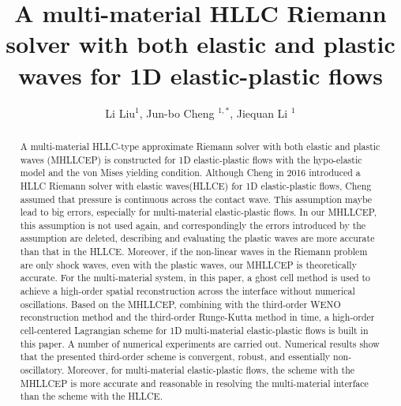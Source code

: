 \documentclass[review]{elsarticle}
\begin{document}

\title{A multi-material HLLC Riemann solver with both elastic and plastic waves for 1D  elastic-plastic flows}
\author{Li Liu$^1$, Jun-bo Cheng $^{1,*}$, Jiequan Li $^{1}$}

\maketitle

\address{$^1$  Institute of Applied Physics and Computational Mathematics, Beijing 100094, China }

\begin{abstract}
  A multi-material HLLC-type  approximate Riemann solver with both elastic and plastic waves (MHLLCEP) is constructed for 1D elastic-plastic flows with the  hypo-elastic model and the von Mises yielding condition. Although Cheng in 2016 introduced a HLLC Riemann solver with elastic waves(HLLCE) for 1D elastic-plastic flows, Cheng assumed that pressure is continuous across the contact wave. This assumption maybe lead to big errors, especially for multi-material elastic-plastic flows. In our MHLLCEP, this assumption is not used again, and correspondingly the errors introduced by the assumption are deleted, describing and evaluating the plastic waves are more accurate than that in the HLLCE. Moreover, if the non-linear waves in the Riemann problem are only shock waves, even with the plastic waves, our MHLLCEP is theoretically accurate. For  the multi-material system, in this paper, a ghost cell method is used to achieve a high-order spatial reconstruction across the interface without numerical oscillations. Based on the MHLLCEP, combining with the third-order WENO reconstruction method and the third-order Runge-Kutta method in time, a high-order cell-centered Lagrangian scheme for 1D multi-material elastic-plastic flows is built in this paper. A number of numerical experiments are carried out. Numerical results show  that the presented third-order scheme is convergent, robust, and essentially non-oscillatory. Moreover, for multi-material elastic-plastic flows, the scheme with  the MHLLCEP is more accurate and reasonable in resolving the multi-material interface than the scheme with the  HLLCE.
\end{abstract}
\end{document}

